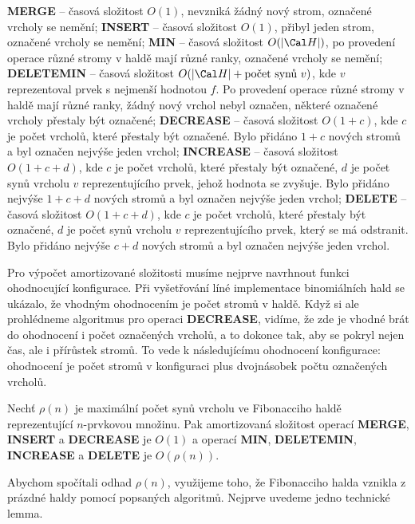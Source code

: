 \documentclass[a4paper,12pt]{article}
\begin{document}
{\bf MERGE} -- časová složitost $O(1)$, nevzniká žádný 
nový strom, 
ozna\-če\-né vrcholy se nemění;\newline 
{\bf INSERT} -- časová složitost $O(1)$, přibyl jeden strom, 
označené vrcholy se nemění;\newline 
{\bf MIN} -- časová složitost $O(|\Cal H|)$, po provedení operace 
různé stro\-my v haldě mají různé 
ranky, označené vrcholy se nemění;\newline 
{\bf DELETEMIN} -- časová složitost $O(|\Cal H|+\text{\rm počet synů }
v)$,
kde $v$ reprezentoval prvek s nej\-menší hodnotou $f$. Po 
provedení ope\-ra\-ce různé stromy v haldě mají 
různé ranky, žádný nový vrchol nebyl 
označen, některé označené vrcholy přestaly být označené;\newline 
{\bf DECREASE} -- časová složitost $O(1+c)$, kde $c$ je počet 
vrcholů, které přestaly být označené. 
Bylo přidáno $1+c$ nových stromů a byl označen 
nejvýše jeden vrchol;\newline 
{\bf INCREASE} -- časová složitost $O(1+c+d)$, kde $c$ je počet 
vrcholů, které přestaly být označené, $d$ je 
počet synů vrcholu $v$ reprezentujícího prvek, 
jehož hodnota se zvyšuje. Bylo přidáno nejvýše $1
+c+d$ 
nových stromů a byl označen nejvýše jeden 
vrchol;\newline 
{\bf DELETE} -- časová složitost $O(1+c+d)$, kde $c$ je počet 
vrcholů, které přestaly být označené, $d$ je 
počet synů vrcholu $v$ reprezentujícího prvek, 
který se má odstranit. Bylo přidáno nejvýše $c+d$ 
nových stromů a byl označen nejvýše jeden 
vrchol.

Pro výpočet amortizované složitosti 
musíme nejprve navrhnout funkci ohodnocující 
konfigurace.  Při vyšetřování líné implementace binomiálních 
hald se ukázalo, že vhodným ohodnocením je počet stromů 
v haldě. Když si ale prohlédneme algoritmus pro operaci 
{\bf DECREASE}, vidíme, že zde je vhodné brát do ohodnocení i 
počet označených vrcholů, a to dokonce tak, aby 
se pokryl 
nejen čas, ale i přírůstek stromů. To vede k 
následujícímu ohodnocení konfigurace: ohodnocení je počet 
stromů v konfiguraci plus dvojnásobek počtu 
označených vrcholů.

Nechť $\rho (n)$ je maximální 
počet synů vrcholu ve Fibonacciho haldě 
reprezentující $n$-prvkovou množinu.  Pak amortizovaná 
složitost operací {\bf MERGE}, {\bf INSERT} a {\bf DECREASE} je $
O(1)$ a 
operací {\bf MIN}, {\bf DELETEMIN}, {\bf INCREASE} a {\bf DELETE} je $
O(\rho (n))$.

Abychom spočítali odhad $\rho (n)$, využijeme toho, že 
Fibonacciho halda vznikla z prázdné haldy pomocí 
popsaných algoritmů. Nejprve uvedeme jedno technické 
lemma.
\end{document}
